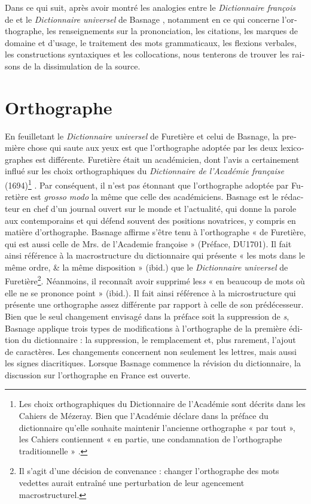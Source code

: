 \documentclass[output=paper,colorlinks,citecolor=brown,arabicfont,chinesefont,booklanguage=french]{langscibook}
\begin{document}
\begin{otherlanguage}{french}
\largerpage
Dans ce qui suit, après avoir montré les analogies entre le \emph{Dictionnaire françois} de \citealt{Richelet1693} et le \emph{Dictionnaire universel} de Basnage \cite{[DU1701]}, notamment en ce qui concerne l’orthographe, les renseignements sur la prononciation, les citations, les marques de domaine et d’usage, le traitement des mots grammaticaux, les flexions verbales, les constructions syntaxiques et les collocations, nous tenterons de trouver les raisons de la dissimulation de la source.

\section{Orthographe}

En feuilletant le \emph{Dictionnaire universel} de Furetière et celui de Basnage, la première chose qui saute aux yeux est que l'orthographe adoptée par les deux lexicographes est différente. Furetière était un académicien, dont l'avis a certainement influé sur les choix orthographiques du \emph{Dictionnaire de l'Académie française} (1694)\footnote{Les choix orthographiques du Dictionnaire de l'Académie sont décrits dans les Cahiers de Mézeray. Bien que l'Académie déclare dans la préface du dictionnaire qu'elle souhaite maintenir l'ancienne orthographe « par tout », les Cahiers contiennent « en partie, une condamnation de l’orthographe traditionnelle » \citep[186]{Catach2001}.} . Par conséquent, il n'est pas étonnant que l’orthographe adoptée par Furetière est \emph{grosso modo} la même que celle des académiciens. Basnage est le rédacteur en chef d'un journal ouvert sur le monde et l'actualité, qui donne la parole aux contemporains et qui défend souvent des positions novatrices, y compris en matière d’orthographe. Basnage affirme s’être tenu à l’orthographe « de Furetière, qui est aussi celle de Mrs. de l’Academie françoise » (Préface, DU1701). Il fait ainsi référence à la macrostructure du dictionnaire qui présente « les mots dans le même ordre, \& la même disposition » (ibid.) que le \emph{Dictionnaire universel} de Furetière\footnote{Il s'agit d'une décision de convenance : changer l'orthographe des mots vedettes aurait entraîné une perturbation de leur agencement macrostructurel.}. Néanmoins, il reconnaît avoir supprimé les\textit{s} « en beaucoup de mots où elle ne se prononce point » (ibid.). Il fait ainsi référence à la microstructure qui présente une orthographe assez différente par rapport à celle de son prédécesseur. Bien que le seul changement envisagé dans la préface soit la suppression de \textit{s}, Basnage applique trois types de modifications à l'orthographe de la première édition du dictionnaire : la suppression, le remplacement et, plus rarement, l'ajout de caractères. Les changements concernent non seulement les lettres, mais aussi les signes diacritiques. Lorsque Basnage commence la révision du dictionnaire, la discussion sur l'orthographe en France est ouverte. 


\end{otherlanguage}
\end{document}
